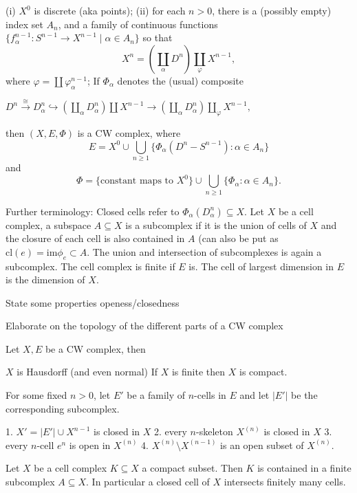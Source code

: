 (i) \( X^0 \) is discrete (aka points); 
(ii) for each \(n > 0\), there is a (possibly empty) index set \(A_n\), and a family of continuous functions 
\(\{f_{\alpha}^{n-1} : S^{n-1} \to X^{n-1} \mid \alpha \in A_n\}\) so that
\[
X^n = \left( \coprod_{\alpha} D^n \right) \coprod_{\varphi} X^{n-1}, 
\]
where \(\varphi = \coprod \varphi_{\alpha}^{n-1}\);
If \(\Phi_\alpha\) denotes the (usual) composite

\( D^n \xrightarrow{\cong} D^n_\alpha \hookrightarrow \left( \coprod_\alpha D^n_\alpha \right) \coprod X^{n-1} \xrightarrow{} \left( \coprod_\alpha D^n_\alpha \right) \coprod_\varphi X^{n-1}, \)

then \((X, E, \Phi)\) is a CW complex, where
\[ E = X^0 \cup \bigcup_{n \geq 1} \{ \Phi_\alpha (D^n - S^{n-1}) : \alpha \in A_n \} \]
and
\[ \Phi = \{ \text{constant maps to } X^0 \} \cup \bigcup_{n \geq 1} \{ \Phi_\alpha : \alpha \in A_n \}. \]

Further terminology:
Closed cells refer to \( \Phi_\alpha(D^n_\alpha) \subseteq X \).
Let \( X \) be a cell complex, a subspace \( A \subseteq X \) is a subcomplex if it is the union of cells of \( X \) and 
the closure of each cell is also contained in \( A \) (can also be put as \( \text{cl}(e) = \text{im} \phi_e \subset A \).
The union and intersection of subcomplexes is again a subcomplex.
The cell complex is finite if \( E \) is. The cell of largest dimension in \( E \) is the dimension of \( X \).

State some properties openess/closedness 

Elaborate on the topology of the different parts of a CW complex

Let \( X, E \) be a CW complex, then

\( X \) is Hausdorff (and even normal)
If \( X \) is finite then \( X \) is compact.

For some fixed \( n > 0 \), let \( E' \) be a family of \( n \)-cells in \( E \)
and let \( |E'| \) be the corresponding subcomplex.

1. \( X' = |E'| \cup X^{n-1} \) is closed in \( X \)
2. every \( n \)-skeleton \( X^{(n)} \) is closed in \( X \)
3. every \( n \)-cell \( e^n \) is open in \( X^{(n)} \)
4. \( X^{(n)} \setminus X^{(n-1)} \) is an open subset of \( X^{(n)} \).

Let \( X \) be a cell complex \( K \subseteq X \) a compact subset. 
Then \( K \) is contained in a finite subcomplex \( A \subseteq X \).
In particular a closed cell of \( X \) intersects finitely many cells.

